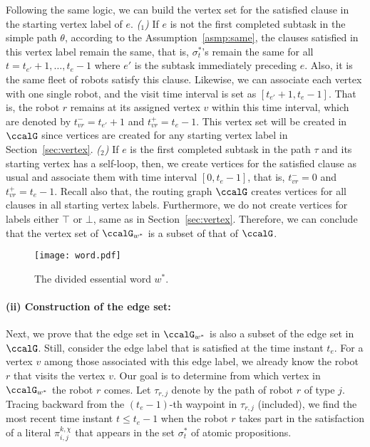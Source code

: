 \documentclass[Afour,sageh,times]{sagej}
\newcounter{mycounter}
\renewcommand{\ap}[3]{\mathcal{\pi}_{{#1},{#2}}^{#3}}
\begin{document}
{{
Following the same logic, we can build the vertex set for the satisfied clause in the starting vertex label of $e$. {\it ($_1$)} If $e$ is not the first completed subtask in the simple path $\theta$,  according to the Assumption~\ref{asmp:same}, the clauses satisfied in this vertex label remain the same, that is, $\sigma^*_t$'s remain the same for all $t= t_{e'}+1, \ldots, t_{e}-1$ where $e'$ is the subtask immediately preceding $e$. Also, it is the same fleet of robots satisfy this clause. Likewise, we can associate each vertex with one single robot, and the visit time interval is set as $[t_{e'}+1, t_{e}-1]$. That is, the robot $r$ remains at its assigned vertex $v$  within this time interval,
which are denoted by $t_{vr}^- = t_{e'}+1$ and $t_{vr}^+ = t_{e}-1$. This vertex set will be created in $\ccalG$ since vertices are created for any starting vertex label in Section~\ref{sec:vertex}. {\it ($_2$)} \label{app:vertex_b} If  $e$ is the first completed subtask in the path $\tau$ and its starting vertex has a self-loop, then,  we create vertices for the satisfied clause as usual and associate them with time interval $[0, t_e-1]$, that is, $t_{vr}^-=0$ and $t_{vr}^+ = t_e-1$. Recall also that, the routing graph $\ccalG$ creates vertices for all clauses in all starting  vertex labels.
Furthermore, we do not create vertices for labels either $\top$ or $\bot$, same as in Section~\ref{sec:vertex}. Therefore, we can conclude that the vertex set of $\ccalG_{w^*}$ is a subset of that of $\ccalG$.



\begin{figure}[!t]
  \centering
  \texttt{[image: word.pdf]}
  \caption{The divided essential word $w^*$.}
  \label{fig:word}
\end{figure}

\paragraph{(ii) Construction of the edge set:}\label{app:edge_set} Next, we prove that the edge set in $\ccalG_{w^*}$ is also a subset of the edge set in $\ccalG$. Still, consider the edge label that is satisfied at the time instant $t_e$. For a vertex $v$ among those associated with this edge label, we already know the robot $r$ that visits the vertex $v$. Our goal is to determine from which vertex in $\ccalG_{w^*}$ the robot $r$ comes. Let $\tau_{r,j}$ denote by the path of robot $r$ of type $j$. Tracing backward from the $(t_{e}-1)$-th waypoint in $\tau_{r,j}$ (included), we find the most recent time instant $t\leq t_e -1$  when the robot $r$ takes part in the satisfaction of a literal $\ap{i}{j}{k,\chi}$ that appears in the set $\sigma^*_{t}$ of atomic propositions. 

}}
\end{document}

